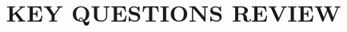 \documentclass[%
 aip,
 jmp,%
 amsmath,amssymb,
 reprint,%
]{revtex4-1}
\begin{document}

\title[EMET8005 - INTRODUCTORY ECONOMETRICS]{KEY QUESTIONS REVIEW}%






\maketitle

\end{document}
